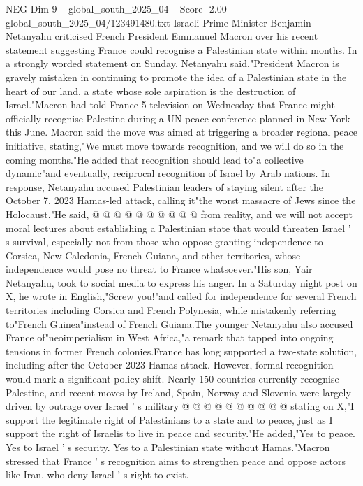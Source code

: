 \begin{textsample}{NEG Dim 9 – global\_south\_2025\_04 – Score -2.00 – global\_south\_2025\_04/123491480.txt}  \label{ex:f9_neg_272}
Israeli Prime Minister Benjamin Netanyahu criticised French President Emmanuel Macron over his recent statement suggesting France could recognise a Palestinian state within months.
In a strongly worded statement on Sunday, Netanyahu said,"President Macron is gravely mistaken in continuing to promote the idea of a Palestinian state in the heart of our land, a state whose sole aspiration is the destruction of Israel."Macron had told France 5 television on Wednesday that France might officially recognise Palestine during a UN peace conference planned in New York this June.
Macron said the move was aimed at triggering a broader regional peace initiative, stating,"We must move towards recognition, and we will do so in the coming months."He added that recognition should lead to"a collective dynamic"and eventually, reciprocal recognition of Israel by Arab nations.
In response, Netanyahu accused Palestinian leaders of staying silent after the October 7, 2023 Hamas-led attack, calling it"the worst massacre of Jews since the Holocaust."He said, @ @ @ @ @ @ @ @ @ @ from reality, and we will not accept moral lectures about establishing a Palestinian state that would threaten Israel ' s survival, especially not from those who oppose granting independence to Corsica, New Caledonia, French Guiana, and other territories, whose independence would pose no threat to France whatsoever."His son, Yair Netanyahu, took to social media to express his anger.
In a Saturday night post on X, he wrote in English,"Screw you!"and called for independence for several French territories including Corsica and French Polynesia, while mistakenly referring to"French Guinea"instead of French Guiana.The younger Netanyahu also accused France of"neoimperialism in West Africa,"a remark that tapped into ongoing tensions in former French colonies.France has long supported a two-state solution, including after the October 2023 Hamas attack.
However, formal recognition would mark a significant policy shift.
Nearly 150 countries currently recognise Palestine, and recent moves by Ireland, Spain, Norway and Slovenia were largely driven by outrage over Israel ' s military @ @ @ @ @ @ @ @ @ @ stating on X,"I support the legitimate right of Palestinians to a state and to peace, just as I support the right of Israelis to live in peace and security."He added,"Yes to peace.
Yes to Israel ' s security.
Yes to a Palestinian state without Hamas."Macron stressed that France ' s recognition aims to strengthen peace and oppose actors like Iran, who deny Israel ' s right to exist.

\end{textsample}
